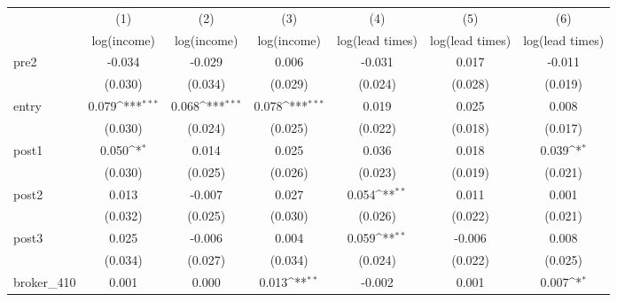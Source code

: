 {
\def\sym#1{\ifmmode^{#1}\else\(^{#1}\)\fi}
\begin{tabular}{l*{6}{c}}
\toprule
            &\multicolumn{1}{c}{(1)}&\multicolumn{1}{c}{(2)}&\multicolumn{1}{c}{(3)}&\multicolumn{1}{c}{(4)}&\multicolumn{1}{c}{(5)}&\multicolumn{1}{c}{(6)}\\
            &\multicolumn{1}{c}{log(income)}&\multicolumn{1}{c}{log(income)}&\multicolumn{1}{c}{log(income)}&\multicolumn{1}{c}{log(lead times)}&\multicolumn{1}{c}{log(lead times)}&\multicolumn{1}{c}{log(lead times)}\\
\midrule
pre2        &      -0.034         &      -0.029         &       0.006         &      -0.031         &       0.017         &      -0.011         \\
            &     (0.030)         &     (0.034)         &     (0.029)         &     (0.024)         &     (0.028)         &     (0.019)         \\
\addlinespace
entry       &       0.079\sym{***}&       0.068\sym{***}&       0.078\sym{***}&       0.019         &       0.025         &       0.008         \\
            &     (0.030)         &     (0.024)         &     (0.025)         &     (0.022)         &     (0.018)         &     (0.017)         \\
\addlinespace
post1       &       0.050\sym{*}  &       0.014         &       0.025         &       0.036         &       0.018         &       0.039\sym{*}  \\
            &     (0.030)         &     (0.025)         &     (0.026)         &     (0.023)         &     (0.019)         &     (0.021)         \\
\addlinespace
post2       &       0.013         &      -0.007         &       0.027         &       0.054\sym{**} &       0.011         &       0.001         \\
            &     (0.032)         &     (0.025)         &     (0.030)         &     (0.026)         &     (0.022)         &     (0.021)         \\
\addlinespace
post3       &       0.025         &      -0.006         &       0.004         &       0.059\sym{**} &      -0.006         &       0.008         \\
            &     (0.034)         &     (0.027)         &     (0.034)         &     (0.024)         &     (0.022)         &     (0.025)         \\
\addlinespace
broker\_410  &       0.001         &       0.000         &       0.013\sym{**} &      -0.002         &       0.001         &       0.007\sym{*}  \\

\end{tabular}}
